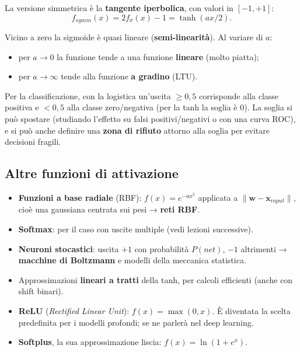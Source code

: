 La versione simmetrica è la \textbf{tangente iperbolica}, con valori in
\([-1, +1]\): \[
f_{symm}(x) = 2f_\sigma(x) - 1 = \tanh(ax/2).
\]

Vicino a zero la sigmoide è quasi lineare (\textbf{semi-linearità}). Al
variare di \(a\):

\begin{itemize}
\tightlist
\item
  per \(a \to 0\) la funzione tende a una funzione \textbf{lineare}
  (molto piatta);
\item
  per \(a \to \infty\) tende alla funzione \textbf{a gradino} (LTU).
\end{itemize}

Per la classificazione, con la logistica un'uscita \(\ge 0{,}5\)
corrisponde alla classe positiva e \(< 0{,}5\) alla classe zero/negativa
(per la tanh la soglia è 0). La soglia si può spostare (studiando
l'effetto su falsi positivi/negativi o con una curva ROC), e si può
anche definire una \textbf{zona di rifiuto} attorno alla soglia per
evitare decisioni fragili.

\subsection{Altre funzioni di
attivazione}\label{altre-funzioni-di-attivazione}

\begin{itemize}
\tightlist
\item
  \textbf{Funzioni a base radiale} (RBF): \(f(x) = e^{-ax^2}\) applicata
  a \(\|\mathbf{w} - \mathbf{x}_{input}\|\), cioè una gaussiana centrata
  sui pesi → \textbf{reti RBF}.
\item
  \textbf{Softmax}: per il caso con uscite multiple (vedi lezioni
  successive).
\item
  \textbf{Neuroni stocastici}: uscita \(+1\) con probabilità \(P(net)\),
  \(-1\) altrimenti → \textbf{macchine di Boltzmann} e modelli della
  meccanica statistica.
\item
  Approssimazioni \textbf{lineari a tratti} della tanh, per calcoli
  efficienti (anche con shift binari).
\item
  \textbf{ReLU} (\emph{Rectified Linear Unit}): \(f(x) = \max(0, x)\). È
  diventata la scelta predefinita per i modelli profondi; se ne parlerà
  nel deep learning.
\item
  \textbf{Softplus}, la sua approssimazione liscia:
  \(f(x) = \ln(1 + e^x)\).
\end{itemize}

